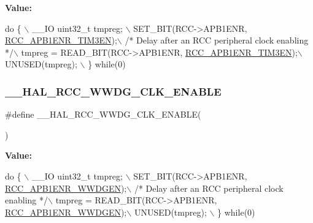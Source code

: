 {\bfseries Value\+:}
\begin{DoxyCode}
\textcolor{keywordflow}{do} \{ \(\backslash\)
                                        \_\_IO uint32\_t tmpreg; \(\backslash\)
                                        SET\_BIT(RCC->APB1ENR, \hyperlink{group___peripheral___registers___bits___definition_ga75bfa33eb00ee30c6e22f7ceea464ac7}{RCC\_APB1ENR\_TIM3EN});\(\backslash\)
                                        \textcolor{comment}{/* Delay after an RCC peripheral clock enabling */}\(\backslash\)
                                        tmpreg = READ\_BIT(RCC->APB1ENR, 
      \hyperlink{group___peripheral___registers___bits___definition_ga75bfa33eb00ee30c6e22f7ceea464ac7}{RCC\_APB1ENR\_TIM3EN});\(\backslash\)
                                        UNUSED(tmpreg); \(\backslash\)
                                      \} \textcolor{keywordflow}{while}(0)
\end{DoxyCode}
\mbox{\label{group___r_c_c___a_p_b1___clock___enable___disable_gab0c13cc10b36c32d750be226d2fda3b2}} 
\subsubsection{\texorpdfstring{\+\_\+\+\_\+\+H\+A\+L\+\_\+\+R\+C\+C\+\_\+\+W\+W\+D\+G\+\_\+\+C\+L\+K\+\_\+\+E\+N\+A\+B\+LE}{\_\_HAL\_RCC\_WWDG\_CLK\_ENABLE}}
{\footnotesize\ttfamily \#define \+\_\+\+\_\+\+H\+A\+L\+\_\+\+R\+C\+C\+\_\+\+W\+W\+D\+G\+\_\+\+C\+L\+K\+\_\+\+E\+N\+A\+B\+LE(\begin{DoxyParamCaption}{ }\end{DoxyParamCaption})}

{\bfseries Value\+:}
\begin{DoxyCode}
\textcolor{keywordflow}{do} \{ \(\backslash\)
                                        \_\_IO uint32\_t tmpreg; \(\backslash\)
                                        SET\_BIT(RCC->APB1ENR, \hyperlink{group___peripheral___registers___bits___definition_gaf712b922ee776a972d2efa3da0ea4733}{RCC\_APB1ENR\_WWDGEN});\(\backslash\)
                                        \textcolor{comment}{/* Delay after an RCC peripheral clock enabling */}\(\backslash\)
                                        tmpreg = READ\_BIT(RCC->APB1ENR, 
      \hyperlink{group___peripheral___registers___bits___definition_gaf712b922ee776a972d2efa3da0ea4733}{RCC\_APB1ENR\_WWDGEN});\(\backslash\)
                                        UNUSED(tmpreg); \(\backslash\)
                                      \} \textcolor{keywordflow}{while}(0)
\end{DoxyCode}
